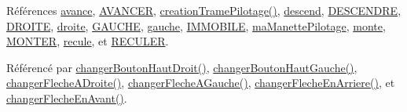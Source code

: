 Références \hyperlink{manette_8h_source_l00247}{avance}, \hyperlink{manette_8h_source_l00038}{A\+V\+A\+N\+C\+ER}, \hyperlink{class_manette_a39de9cbde743771debc15501f8f8c154}{creation\+Trame\+Pilotage()}, \hyperlink{manette_8h_source_l00252}{descend}, \hyperlink{manette_8h_source_l00050}{D\+E\+S\+C\+E\+N\+D\+RE}, \hyperlink{manette_8h_source_l00068}{D\+R\+O\+I\+TE}, \hyperlink{manette_8h_source_l00250}{droite}, \hyperlink{manette_8h_source_l00062}{G\+A\+U\+C\+HE}, \hyperlink{manette_8h_source_l00249}{gauche}, \hyperlink{manette_8h_source_l00032}{I\+M\+M\+O\+B\+I\+LE}, \hyperlink{manette_8h_source_l00246}{ma\+Manette\+Pilotage}, \hyperlink{manette_8h_source_l00251}{monte}, \hyperlink{manette_8h_source_l00056}{M\+O\+N\+T\+ER}, \hyperlink{manette_8h_source_l00248}{recule}, et \hyperlink{manette_8h_source_l00044}{R\+E\+C\+U\+L\+ER}.



Référencé par \hyperlink{manette_8cpp_source_l00486}{changer\+Bouton\+Haut\+Droit()}, \hyperlink{manette_8cpp_source_l00479}{changer\+Bouton\+Haut\+Gauche()}, \hyperlink{manette_8cpp_source_l00542}{changer\+Fleche\+A\+Droite()}, \hyperlink{manette_8cpp_source_l00533}{changer\+Fleche\+A\+Gauche()}, \hyperlink{manette_8cpp_source_l00524}{changer\+Fleche\+En\+Arriere()}, et \hyperlink{manette_8cpp_source_l00515}{changer\+Fleche\+En\+Avant()}.


